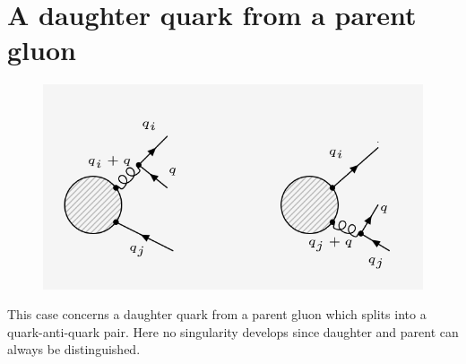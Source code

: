 \section{A daughter quark from a parent gluon}
\begin{figure}[ht!]
\centering
\includegraphics[scale=0.7]{images/QG/QGDiagrams.png}
\end{figure}

This case concerns a daughter quark from a parent gluon which splits into a quark-anti-quark pair. Here no singularity develops since daughter and parent can always be distinguished.\\

